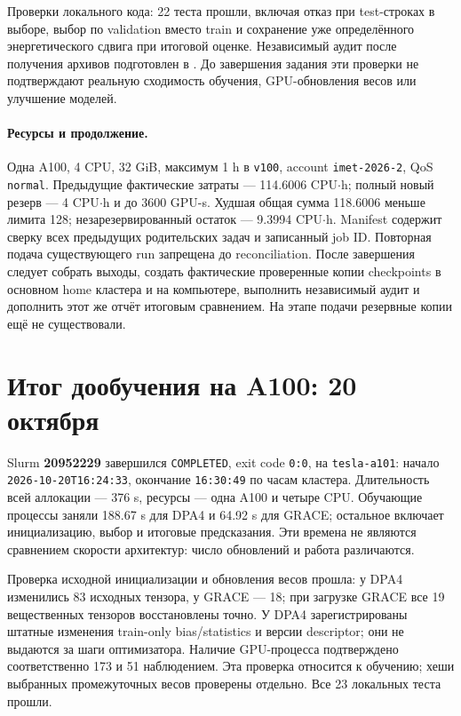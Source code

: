 \documentclass[11pt,a4paper]{article}
\begin{document}
Проверки локального кода: 22 теста прошли, включая отказ при test-строках
в выборе, выбор по validation вместо train и сохранение уже определённого
энергетического сдвига при итоговой оценке. Независимый аудит после
получения архивов подготовлен в .
До завершения задания эти проверки не подтверждают реальную сходимость
обучения, GPU-обновления весов или улучшение моделей.

\paragraph{Ресурсы и продолжение.}
Одна A100, 4 CPU, 32 GiB, максимум 1 h в \texttt{v100},
account \texttt{imet-2026-2}, QoS \texttt{normal}.
Предыдущие фактические затраты --- 114.6006 CPU$\cdot$h;
полный новый резерв --- 4 CPU$\cdot$h и до 3600 GPU-s.
Худшая общая сумма 118.6006 меньше лимита 128;
незарезервированный остаток --- 9.3994 CPU$\cdot$h.
Manifest содержит сверку всех предыдущих родительских задач и записанный
job ID. Повторная подача существующего run запрещена до reconciliation.
После завершения следует собрать выходы, создать фактические проверенные
копии checkpoints в основном home кластера и на компьютере, выполнить
независимый аудит и дополнить этот же отчёт итоговым сравнением.
На этапе подачи резервные копии ещё не существовали.

\section{Итог дообучения на A100: 20 октября}
\label{sec:finetune-final}
Slurm \textbf{20952229} завершился \texttt{COMPLETED}, exit code
\texttt{0:0}, на \texttt{tesla-a101}: начало
\texttt{2026-10-20T16:24:33}, окончание \texttt{16:30:49}
по часам кластера. Длительность всей аллокации --- 376 s,
ресурсы --- одна A100 и четыре CPU. Обучающие процессы заняли
188.67 s для DPA4 и 64.92 s для GRACE; остальное включает
инициализацию, выбор и итоговые предсказания. Эти времена не являются
сравнением скорости архитектур: число обновлений и работа различаются.

Проверка исходной инициализации и обновления весов прошла:
у DPA4 изменились 83 исходных тензора, у GRACE --- 18;
при загрузке GRACE все 19 вещественных тензоров восстановлены точно.
У DPA4 зарегистрированы штатные изменения train-only bias/statistics
и версии descriptor; они не выдаются за шаги оптимизатора.
Наличие GPU-процесса подтверждено соответственно 173 и 51 наблюдением.
Эта проверка относится к обучению; хеши выбранных промежуточных весов
проверены отдельно. Все 23 локальных теста прошли.
\end{document}
